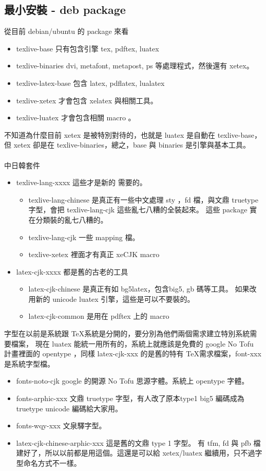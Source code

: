 \subsection{最小安裝 - deb package}
從目前 debian/ubuntu 的 package 來看
\begin{itemize}
\item texlive-base 只有包含引擎 tex, pdftex, luatex
\item texlive-binaries dvi, metafont, metapost, ps 等處理程式，然後還有 xetex。
\item texlive-latex-base 包含 latex, pdflatex, lualatex
\item texlive-xetex 才會包含 xelatex 與相關工具。
\item texlive-luatex 才會包含相關 macro 。
\end{itemize}
不知道為什麼目前 xetex 是被特別對待的，也就是 luatex 是自動在 texlive-base，
但 xetex 卻是在 texlive-binaries，總之，base 與 binaries 是引擎與基本工具。
\\\\
中日韓套件
\begin{itemize}
\item texlive-lang-xxxx 這些才是新的 \XeTeX 需要的。
  \begin{itemize}
  \item texlive-lang-chinese 是真正有一些中文處理 sty ，fd 檔，與文鼎
   truetype 字型，會把 texlive-lang-cjk 這些亂七八糟的全裝起來。
   這些 package 實在分類裝的亂七八糟的。
  \item texlive-lang-cjk 一些 mapping 檔。
  \item texlive-xetex 裡面才有真正 xeCJK macro
  \end{itemize}
\item latex-cjk-xxxx 都是舊的古老的工具
  \begin{itemize}
  \item latex-cjk-chinese 是真正有如 bg5latex，包含big5, gb 碼等工具。
        如果改用新的 unicode {\XeTeX} luatex 引擎，這些是可以不要裝的。
  \item latex-cjk-common 是用在 pdftex 上的 macro
  \end{itemize}
\end{itemize}
字型在以前是系統跟 \TeX 系統是分開的，要分別為他們兩個需求建立特別系統需要檔案，
現在 {\XeTeX} luatex 能統一用所有的，系統上就應該是免費的 google No Tofu 
計畫裡面的 opentype ，同樣 latex-cjk-xxx 的是舊的特有 \TeX 需求檔案，font-xxx
是系統字型檔。
\begin{itemize}
\item fonts-noto-cjk google 的開源 No Tofu 思源字體。系統上 opentype 字體。
\item fonts-arphic-xxx 文鼎 truetype 字型，有人改了原本type1 big5 編碼成為 
truetype unicode 編碼給大家用。
\item fonts-wqy-xxx 文泉驛字型。
\item latex-cjk-chinese-arphic-xxx 這是舊的文鼎 type 1 字型。
有 tfm, fd 與 pfb 檔建好了，所以以前都是用這個。這還是可以給 xetex/luatex
繼續用，只不過字型命名方式不一樣。
\end{itemize}
